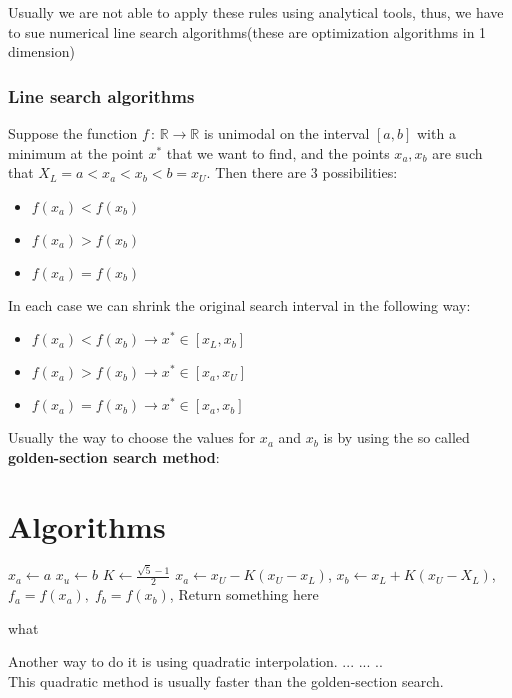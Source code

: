 Usually we are not able to apply these rules using analytical tools, thus, we have to sue numerical line search algorithms(these are optimization algorithms in 1 dimension)

\subsubsection{Line search algorithms}

Suppose the function $f\,:\,\mathbb{R} \longrightarrow \mathbb{R}  $ is unimodal on the interval $[a,b]$ with a minimum at the point  $x^{*}$ that we want to find, and the points $x_a, x_b$ are such that  $X_L = a < x_a < x_b < b = x_U$. Then there are 3 possibilities:
 \begin{itemize}
     \item $f(x_a) < f(x_b)$
     \item $f(x_a) > f(x_b)$
     \item $f(x_a) = f(x_b)$
\end{itemize}
In each case we can shrink the original search interval in the following way:

 \begin{itemize}
     \item $f(x_a) < f(x_b) \rightarrow  x^{*} \in [x_L,x_b]$ 
     \item $f(x_a) > f(x_b) \rightarrow  x^{*} \in [x_a,x_U]$
     \item $f(x_a) = f(x_b) \rightarrow x^{*} \in [x_a,x_b]$
\end{itemize}

Usually the way to choose the values for $x_a$ and  $x_b$ is by using the so called \textbf{golden-section search method}:

\section{Algorithms}
\begin{algorithm}[H]
\SetAlgoLined
\SetNoFillComment
\vspace{3mm}
$x_a \leftarrow a$\;
$x_u \leftarrow b$\;
$K \leftarrow \frac{\sqrt{5} - 1}{2}$\;
 {
    $x_a \leftarrow x_U - K(x_U-x_L)$,  $x_b \leftarrow x_L + K(x_U - X_L)$,
     $f_a = f(x_a),\; f_b = f(x_b)$,
}
\Return Return something here\;
\caption{what}
\end{algorithm}

Another way to do it is using quadratic interpolation.
...
...
..
\\
This quadratic method is usually faster than the golden-section search.


